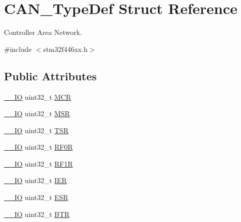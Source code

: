 \hypertarget{struct_c_a_n___type_def}{}\section{C\+A\+N\+\_\+\+Type\+Def Struct Reference}
\label{struct_c_a_n___type_def}


Controller Area Network.  




{\ttfamily \#include $<$stm32f446xx.\+h$>$}

\subsection*{Public Attributes}
\begin{DoxyCompactItemize}
\item 
\hyperlink{core__sc300_8h_aec43007d9998a0a0e01faede4133d6be}{\+\_\+\+\_\+\+IO} uint32\+\_\+t \hyperlink{struct_c_a_n___type_def_a1282eee79a22003257a7a5daa7f4a35f}{M\+CR}
\item 
\hyperlink{core__sc300_8h_aec43007d9998a0a0e01faede4133d6be}{\+\_\+\+\_\+\+IO} uint32\+\_\+t \hyperlink{struct_c_a_n___type_def_af98b957a4e887751fbd407d3e2cf93b5}{M\+SR}
\item 
\hyperlink{core__sc300_8h_aec43007d9998a0a0e01faede4133d6be}{\+\_\+\+\_\+\+IO} uint32\+\_\+t \hyperlink{struct_c_a_n___type_def_acbc82ac4e87e75350fc586be5e56d95b}{T\+SR}
\item 
\hyperlink{core__sc300_8h_aec43007d9998a0a0e01faede4133d6be}{\+\_\+\+\_\+\+IO} uint32\+\_\+t \hyperlink{struct_c_a_n___type_def_ad8e858479e26ab075ee2ddb630e8769d}{R\+F0R}
\item 
\hyperlink{core__sc300_8h_aec43007d9998a0a0e01faede4133d6be}{\+\_\+\+\_\+\+IO} uint32\+\_\+t \hyperlink{struct_c_a_n___type_def_a69a528d1288c1de666df68655af1d20e}{R\+F1R}
\item 
\hyperlink{core__sc300_8h_aec43007d9998a0a0e01faede4133d6be}{\+\_\+\+\_\+\+IO} uint32\+\_\+t \hyperlink{struct_c_a_n___type_def_a530babbc4b9584c93a1bf87d6ce8b8dc}{I\+ER}
\item 
\hyperlink{core__sc300_8h_aec43007d9998a0a0e01faede4133d6be}{\+\_\+\+\_\+\+IO} uint32\+\_\+t \hyperlink{struct_c_a_n___type_def_ab1a1b6a7c587443a03d654d3b9a94423}{E\+SR}
\item 
\hyperlink{core__sc300_8h_aec43007d9998a0a0e01faede4133d6be}{\+\_\+\+\_\+\+IO} uint32\+\_\+t \hyperlink{struct_c_a_n___type_def_accad1e4155459a13369f5ad0e7c6da29}{B\+TR}
\item 

\end{DoxyCompactItemize}
